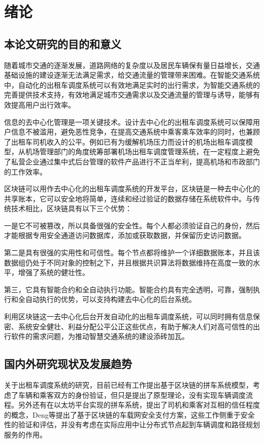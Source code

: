 \chapter{绪论}
\section{本论文研究的目的和意义}

随着城市交通的逐渐发展，道路网络的复杂度以及居民车辆保有量日益增长，交通基础设施的建设逐渐无法满足需求，给交通流量的管理带来困难。在智能交通系统中，自动化的出租车调度系统可以有效地满足实时的出行需求，为智能交通系统的完善提供技术支持，有效地满足城市交通需求以及交通流量的管理与诱导，能够有效提高用户出行效率。

信息的去中心化管理是一项关键技术。设计去中心化的出租车调度系统可以保障用户信息不被滥用，避免恶性竞争，在提高交通系统中乘客乘车效率的同时，也兼顾了出租车司机收入的公平。例如已有为缓解机场压力而设计的机场出租车调度模型，从机场管理部门的角度统筹部署机场出租车调度管理系统，在一定程度上避免了私营企业通过集中式后台管理的软件产品进行不正当牟利，提高机场和市政部门的工作效率。

区块链可以用作去中心化的出租车调度系统的开发平台，区块链是一种去中心化的共享账本，它可以安全地将简单，连续和经过验证的数据存储在系统软件中。与传统技术相比，区块链具有以下三个优势：

一是它不可被篡改，所以具备很强的安全性。每个人都必须验证自己的身份，然后才能根据专用安全通道访问数据库，添加或获取数据，并保留历史访问数据。

第二是具有很强的实用性和可信性。每个节点都将维护一个详细数据账本，并且该数据组仍处于不同对象的控制之下，并且根据共识算法将数据维持在高度一致的水平，增强了系统的健壮性。

第三，它具有智能合约和全自动执行功能。智能合约具有完全透明，可靠，强制执行和全自动执行的优势，可以支持构建去中心化的后台系统。

利用区块链这一去中心化后台开发自动化的出租车调度系统，可以同时拥有信息保密、系统安全健壮、利益分配公平公正这些优点，有助于解决人们对高可信性的出行软件的需求问题，为推动智慧交通系统的建设添砖加瓦。


\section{国内外研究现状及发展趋势}
关于出租车调度系统的研究，目前已经有工作提出基于区块链的拼车系统模型，考虑了车辆和乘客双方的身份验证，但只是提出了原型理论，没有实现车辆调度流程。另外还有在以太坊平台实现的拼车系统，提出了司机和乘客对互相的信任程度的概念，Deng等提出了基于区块链的车载网安全支付方案，这些工作侧重于安全性的验证和评估，并没有考虑在实际应用中让分布式节点起到车辆调度和路径规划服务的作用。

